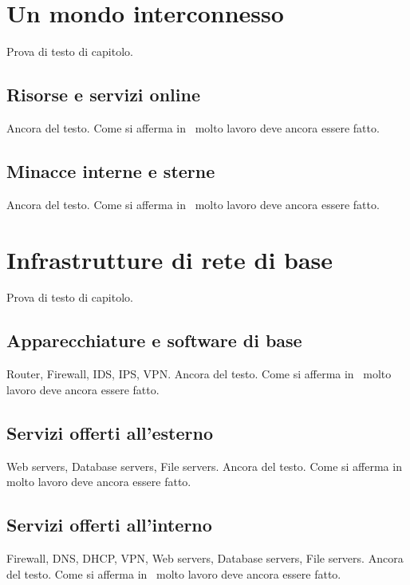 \section{Un mondo interconnesso}

Prova di testo di capitolo.

\subsection{Risorse e servizi online}

Ancora del testo. Come si afferma in~\cite{jones96analysis} molto lavoro deve ancora essere fatto.

\subsection{Minacce interne e sterne}

Ancora del testo. Come si afferma in~\cite{jones96analysis} molto lavoro deve ancora essere fatto.

\section{Infrastrutture di rete di base}

Prova di testo di capitolo.

\subsection{Apparecchiature e software di base}

Router, Firewall, IDS, IPS, VPN. Ancora del testo. Come si afferma in~\cite{jones96analysis} molto lavoro deve ancora essere fatto.

\subsection{Servizi offerti all'esterno}

Web servers, Database servers, File servers. Ancora del testo. Come si afferma in~\cite{jones96analysis} molto lavoro deve ancora essere fatto.

\subsection{Servizi offerti all'interno}

Firewall, DNS, DHCP, VPN, Web servers, Database servers, File servers. Ancora del testo. Come si afferma in~\cite{jones96analysis} molto lavoro deve ancora essere fatto.


